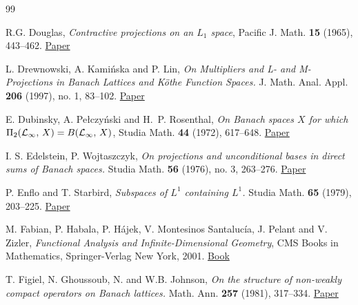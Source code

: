 \documentclass[11pt]{amsart}
\theoremstyle{definition}
\numberwithin{equation}{section}
\begin{document}
\begin{thebibliography}{99}





R.G. Douglas, \textit{Contractive projections on an $L_1$ space}, Pacific J. Math. \textbf{15} (1965), 443--462. \href{https://projecteuclid.org/journals/pacific-journal-of-mathematics/volume-15/issue-2/Contractive-projections-on-an-germ-L_1-space/pjm/1102995798.full}{Paper}


L. Drewnowski, A. Kami\'{n}ska and P. Lin,
\emph{On Multipliers and L- and M-Projections in Banach Lattices and K\"{o}the Function Spaces.}
J. Math. Anal. Appl. \textbf{206} (1997), no. 1, 83--102. \href{https://doi.org/10.1006/jmaa.1997.5197}{Paper}


E. Dubinsky, A. Pe\l{}czy\'nski and H.~P. Rosenthal, \emph{On Banach spaces $X$ for which $\Pi \sb{2}({\mathcal L}\sb{\infty },\,X)=B({\mathcal L}\sb{\infty },\,X)$}, Studia Math. {\bf 44} (1972), 617--648.
\href{https://doi.org/10.4064/sm-44-6-617-648}{Paper}

I. S. Edelstein, P. Wojtaszczyk, 
\textit{On projections and unconditional bases in direct sums of Banach spaces.}
Studia Math. \textbf{56} (1976), no. 3, 263--276. \href{https://doi.org/10.4064/sm-56-3-263-276}{Paper}


P. Enflo and T. Starbird, \emph{Subspaces of $L^{1}$ containing $L^{1}$.} Studia Math. \textbf{65} (1979), 203--225. \href{https://doi.org/10.4064/sm-65-2-203-225}{Paper}

M. Fabian, P. Habala, P. Hájek, V. Montesinos Santalucía, J. Pelant and V. Zizler, \textit{Functional Analysis and Infinite-Dimensional Geometry}, CMS Books in Mathematics, Springer-Verlag New York, 2001. \href{https://doi.org/10.1007/978-1-4757-3480-5}{Book}



T. Figiel, N. Ghoussoub, N. and W.B. Johnson, \textit{On the structure of non-weakly compact operators on Banach lattices.} Math. Ann. \textbf{257} (1981), 317--334. \href{https://doi.org/10.1007/BF01456502}{Paper}




\end{thebibliography}
\end{document}
